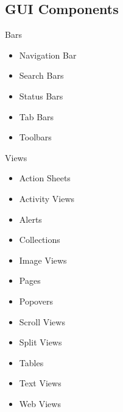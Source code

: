 \subsection {GUI Components}
	
	Bars
	\begin{itemize}
  		\vspace{-0.4cm}\item Navigation Bar
  		\vspace{-0.4cm}\item Search Bars
		\vspace{-0.4cm}\item Status Bars
		\vspace{-0.4cm}\item Tab Bars
		\vspace{-0.4cm}\item Toolbars
	\end{itemize}

	Views
	\begin{itemize}
  		\vspace{-0.4cm}\item Action Sheets
		\vspace{-0.4cm}\item Activity Views
		\vspace{-0.4cm}\item Alerts
		\vspace{-0.4cm}\item Collections
		\vspace{-0.4cm}\item Image Views
		\vspace{-0.4cm}\item Pages
		\vspace{-0.4cm}\item Popovers
		\vspace{-0.4cm}\item Scroll Views
		\vspace{-0.4cm}\item Split Views
		\vspace{-0.4cm}\item Tables
		\vspace{-0.4cm}\item Text Views
		\vspace{-0.4cm}\item Web Views
	\end{itemize}
	
